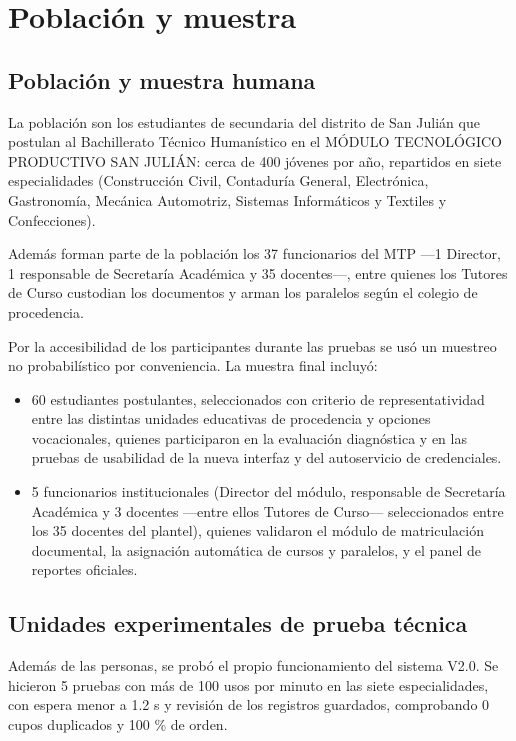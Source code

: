 \section{Población y muestra}
\label{sec:poblacion_muestra}

\subsection{Población y muestra humana}

La población son los estudiantes de secundaria del distrito de San Julián que postulan al Bachillerato Técnico Humanístico en el MÓDULO TECNOLÓGICO PRODUCTIVO SAN JULIÁN: cerca de 400 jóvenes por año, repartidos en siete especialidades (Construcción Civil, Contaduría General, Electrónica, Gastronomía, Mecánica Automotriz, Sistemas Informáticos y Textiles y Confecciones).

Además forman parte de la población los 37 funcionarios del MTP —1 Director, 1 responsable de Secretaría Académica y 35 docentes—, entre quienes los Tutores de Curso custodian los documentos y arman los paralelos según el colegio de procedencia.

Por la accesibilidad de los participantes durante las pruebas se usó un muestreo no probabilístico por conveniencia. La muestra final incluyó:

\begin{itemize}
    \item 60 estudiantes postulantes, seleccionados con criterio de representatividad entre las distintas unidades educativas de procedencia y opciones vocacionales, quienes participaron en la evaluación diagnóstica y en las pruebas de usabilidad de la nueva interfaz y del autoservicio de credenciales.
    \item 5 funcionarios institucionales (Director del módulo, responsable de Secretaría Académica y 3 docentes —entre ellos Tutores de Curso— seleccionados entre los 35 docentes del plantel), quienes validaron el módulo de matriculación documental, la asignación automática de cursos y paralelos, y el panel de reportes oficiales.
\end{itemize}

\subsection{Unidades experimentales de prueba técnica}

Además de las personas, se probó el propio funcionamiento del sistema V2.0. Se hicieron 5 pruebas con más de 100 usos por minuto en las siete especialidades, con espera menor a 1.2 s y revisión de los registros guardados, comprobando 0 cupos duplicados y 100 \% de orden.
